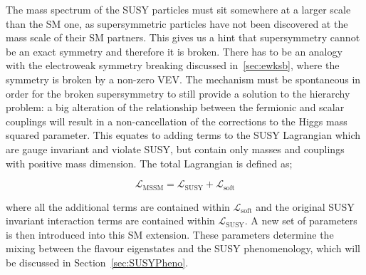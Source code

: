 				The mass spectrum of the \ac{SUSY} particles must sit somewhere at a larger scale than the \ac{SM} one, as supersymmetric particles have not been discovered at the mass scale of their \ac{SM} partners. This gives us a hint that supersymmetry cannot be an exact symmetry and therefore it is broken. There has to be an analogy with the electroweak symmetry breaking discussed in~\ref{sec:ewksb}, where the symmetry is broken by a non-zero \ac{VEV}. The mechanism must be spontaneous in order for the broken supersymmetry to still provide a solution to the hierarchy problem: a big alteration of the relationship between the fermionic and scalar couplings will result in a non-cancellation of the corrections to the Higgs mass squared parameter.
				This equates to adding terms to the \ac{SUSY} Lagrangian which are gauge invariant and violate \ac{SUSY}, but contain only masses and couplings with positive mass dimension. The total Lagrangian is defined as;

				\begin{equation}
				\label{eq:soft_sb}
					\mathcal L_{\mathrm{MSSM}} = \mathcal {L_{\mathrm{SUSY}}} + \mathcal {L_{\mathrm{soft}}}
				\end{equation}

				\noindent where all the additional terms are contained within $\mathcal {L_{\mathrm{soft}}}$ and the original \ac{SUSY} invariant interaction terms are contained within $\mathcal {L_{\mathrm{SUSY}}}$. A new set of parameters is then introduced into this \ac{SM} extension. These parameters determine the mixing between the flavour eigenstates and the \ac{SUSY} phenomenology, which will be discussed in Section~\ref{sec:SUSYPheno}. 



